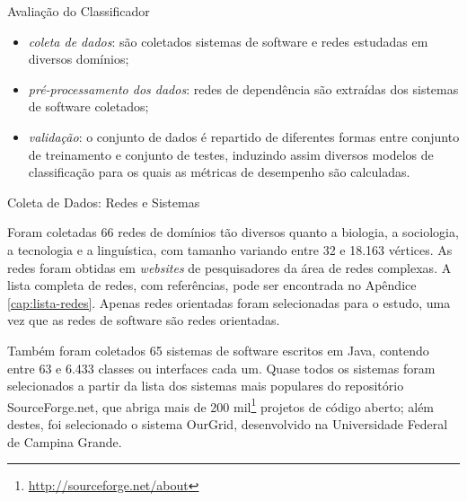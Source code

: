 \begin{section}{Avaliação do Classificador}
	\begin{itemize}
		\item \emph{coleta de dados}: são coletados sistemas de software e redes estudadas em diversos domínios;
		\item \emph{pré-processamento dos dados}: redes de dependência são extraídas dos sistemas de software coletados;
		\item \emph{validação}: o conjunto de dados é repartido de diferentes formas entre conjunto de treinamento e conjunto de testes, induzindo assim diversos modelos de classificação para os quais as métricas de desempenho são calculadas. %
	\end{itemize}
	
	
\begin{subsection}{Coleta de Dados: Redes e Sistemas}

			Foram coletadas 66 redes de domínios tão diversos quanto a biologia, a sociologia, a tecnologia e a linguística, com tamanho variando entre 32 e 18.163 vértices. As redes foram obtidas em \emph{websites} de pesquisadores da área de redes complexas. A lista completa de redes, com referências, pode ser encontrada no Apêndice \ref{cap:lista-redes}. Apenas redes orientadas foram selecionadas para o estudo, uma vez que as redes de software são redes orientadas. 

		  Também foram coletados 65 sistemas de software escritos em Java, contendo entre 63 e 6.433 classes ou interfaces cada um. Quase todos os sistemas foram selecionados a partir da lista dos sistemas mais populares do repositório SourceForge.net, que abriga mais de 200 mil\footnote{\url{http://sourceforge.net/about}} projetos de código aberto; além destes, foi selecionado o sistema OurGrid, desenvolvido na Universidade Federal de Campina Grande. 



\end{subsection}
\end{section}
